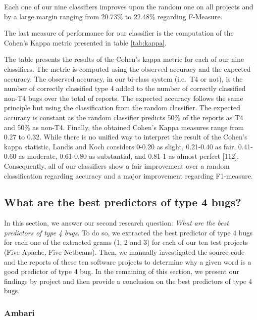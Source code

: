 \documentclass[12pt]{report}
\begin{document}


Each one of our nine classifiers improves upon the random one on all
projects and by a large margin ranging from 20.73\% to 22.48\% regarding
F-Measure.

The last measure of performance for our classifier is the computation of
the Cohen's Kappa metric presented in table \ref{tab:kappa}.



The table presents the results of the Cohen's kappa metric for each of
our nine classifiers. The metric is computed using the observed accuracy
and the expected accuracy. The observed accuracy, in our bi-class system
(i.e.~T4 or not), is the number of correctly classified type 4 added to
the number of correctly classified non-T4 bugs over the total of
reports. The expected accuracy follows the same principle but using the
classification from the random classifier. The expected accuracy is
constant as the random classifier predicts 50\% of the reports as T4 and
50\% as non-T4. Finally, the obtained Cohen's Kappa measures range from
0.27 to 0.32. While there is no unified way to interpret the result of
the Cohen's kappa statistic, Landis and Koch considers 0-0.20 as slight,
0.21-0.40 as fair, 0.41-0.60 as moderate, 0.61-0.80 as substantial, and
0.81-1 as almost perfect {[}112{]}. Consequently, all of our classifiers
show a fair improvement over a random classification regarding accuracy
and a major improvement regarding F1-measure.

\subsection{What are the best predictors of type 4
bugs?}\label{what-are-the-best-predictors-of-type-4-bugs}

In this section, we answer our second research question: \emph{What are
the best predictors of type 4 bugs}. To do so, we extracted the best
predictor of type 4 bugs for each one of the extracted grams (1, 2 and
3) for each of our ten test projects (Five Apache, Five Netbeans). Then,
we manually investigated the source code and the reports of these ten
software projects to determine why a given word is a good predictor of
type 4 bug. In the remaining of this section, we present our findings by
project and then provide a conclusion on the best predictors of type 4
bugs.

\subsubsection{Ambari}\label{ambari}
\end{document}
